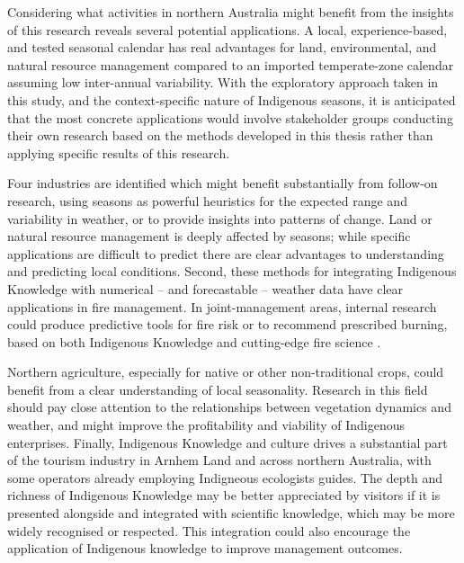 Considering what activities in northern Australia might benefit from the
insights of this research reveals several potential applications.  A local,
experience-based, and tested seasonal calendar has real
advantages for land, environmental, and natural resource management compared
to an imported temperate-zone calendar assuming low inter-annual variability.
%
With the exploratory approach taken in this study, and the context-specific
nature of Indigenous seasons, it is anticipated that the most concrete applications
would involve stakeholder groups conducting their own research based on the
methods developed in this thesis rather than applying specific results of this research.


Four industries are identified which might benefit substantially from follow-on
research, using seasons as powerful heuristics for the expected range
and variability in weather, or to provide insights into patterns of change.
%
Land or natural resource management is deeply affected by seasons; while
specific applications are difficult to predict there are clear advantages
to understanding and predicting local conditions.
%
Second, these methods for integrating Indigenous Knowledge with numerical --
and forecastable -- weather data have clear applications in fire management.
In joint-management areas, internal research could produce predictive tools
for fire risk or to recommend prescribed burning, based on both Indigenous
Knowledge and cutting-edge fire science .

Northern agriculture, especially for native or other non-traditional crops,
could benefit from a clear understanding of local seasonality.  Research in
this field should pay close attention to the relationships between vegetation
dynamics and weather, and might improve the profitability and viability of Indigenous
enterprises.
%
%
Finally, Indigenous Knowledge and culture drives a substantial part of the
tourism industry in Arnhem Land and across northern Australia, with some
operators already employing Indigneous ecologists guides.  The depth and
richness of Indigenous Knowledge may be better appreciated by visitors if
it is presented alongside and integrated with scientific knowledge, which
may be more widely recognised or respected.  This integration could also
encourage the application of Indigenous knowledge to improve management outcomes.


